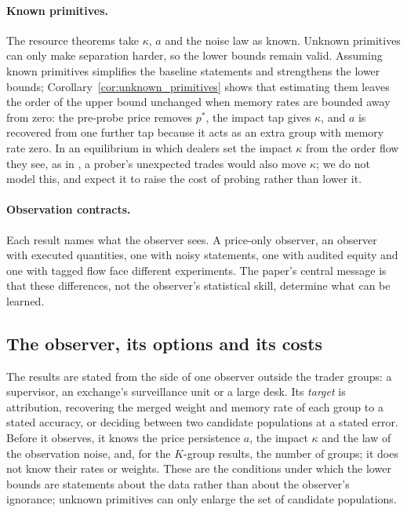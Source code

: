 \documentclass[12pt]{article}
\theoremstyle{definition}
\theoremstyle{remark}
\begin{document}
\paragraph{Known primitives.} The resource theorems take $\kappa$, $a$ and the noise law as known. Unknown primitives can only make separation harder, so the lower bounds remain valid. Assuming known primitives simplifies the baseline statements and strengthens the lower bounds; Corollary~\ref{cor:unknown_primitives} shows that estimating them leaves the order of the upper bound unchanged when memory rates are bounded away from zero: the pre-probe price removes $p^*$, the impact tap gives $\kappa$, and $a$ is recovered from one further tap because it acts as an extra group with memory rate zero. In an equilibrium in which dealers set the impact $\kappa$ from the order flow they see, as in \citet{kyle1985}, a prober's unexpected trades would also move $\kappa$; we do not model this, and expect it to raise the cost of probing rather than lower it.

\paragraph{Observation contracts.} Each result names what the observer sees. A price-only observer, an observer with executed quantities, one with noisy statements, one with audited equity and one with tagged flow face different experiments. The paper's central message is that these differences, not the observer's statistical skill, determine what can be learned.
\subsection{The observer, its options and its costs}\label{sec:observer}
The results are stated from the side of one observer outside the trader groups: a supervisor, an exchange's surveillance unit or a large desk. Its \emph{target} is attribution, recovering the merged weight and memory rate of each group to a stated accuracy, or deciding between two candidate populations at a stated error. Before it observes, it knows the price persistence $a$, the impact $\kappa$ and the law of the observation noise, and, for the $K$-group results, the number of groups; it does not know their rates or weights. These are the conditions under which the lower bounds are statements about the data rather than about the observer's ignorance; unknown primitives can only enlarge the set of candidate populations.
\end{document}
